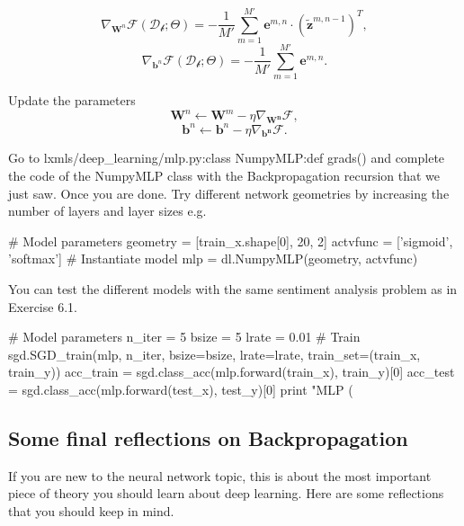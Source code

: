 \begin{algorithm}[t]
\begin{algorithmic}[1]
        $$\nabla_{\mathbf{W}^n}\mathcal{F}(\mathcal{D_b};\Theta)  = -\frac{1}{M'} \sum_{m=1}^{M'} \mathbf{e}^{m,n} \cdot \left(\tilde{\mathbf{z}}^{m,n-1}\right)^T,$$ 
        $$\nabla_{\mathbf{b}^n}\mathcal{F}(\mathcal{D_b};\Theta)  = - \frac{1}{M'} \sum_{m=1}^{M'} \mathbf{e}^{m,n}.$$  

		\vspace{0.3cm}
        \STATE Update the parameters 
            $$\mathbf{W}^n \leftarrow \mathbf{W}^m - \eta \nabla_\mathbf{W^n}\mathcal{F},$$ 
            $$\mathbf{b}^n \leftarrow \mathbf{b}^n - \eta \nabla_\mathbf{b^n}\mathcal{F}.$$ 

	\ENDFOR

	\ENDFOR
	\ENDFOR
\end{algorithmic}
\end{algorithm}

\begin{exercise}
Go to lxmls/deep\_learning/mlp.py:class NumpyMLP:def grads() and complete the
code of the NumpyMLP class with the Backpropagation recursion that we just saw.
Once you are done. Try different network geometries by increasing the number of
layers and layer sizes e.g.
\begin{python}
# Model parameters
geometry = [train_x.shape[0], 20, 2]
actvfunc = ['sigmoid', 'softmax'] 
# Instantiate model
mlp      = dl.NumpyMLP(geometry, actvfunc) 
\end{python}
You can test the different models with the same sentiment analysis problem as
in Exercise 6.1. 
\begin{python}
# Model parameters
n_iter = 5
bsize  = 5
lrate  = 0.01
# Train
sgd.SGD_train(mlp, n_iter, bsize=bsize, lrate=lrate, train_set=(train_x, train_y))
acc_train = sgd.class_acc(mlp.forward(train_x), train_y)[0]
acc_test  = sgd.class_acc(mlp.forward(test_x), test_y)[0]
print "MLP (%
\end{python}
\end{exercise}

\subsection{Some final reflections on Backpropagation}

If you are new to the neural network topic, this is about the most important
piece of theory you should learn about deep learning. Here are some reflections
that you should keep in mind.

